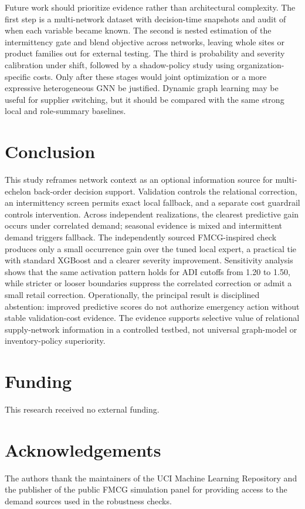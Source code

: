 \documentclass[11pt,a4paper]{article}
\begin{document}
Future work should prioritize evidence rather than architectural complexity. The first step is a multi-network dataset with decision-time snapshots and audit of when each variable became known. The second is nested estimation of the intermittency gate and blend objective across networks, leaving whole sites or product families out for external testing. The third is probability and severity calibration under shift, followed by a shadow-policy study using organization-specific costs. Only after these stages would joint optimization or a more expressive heterogeneous GNN be justified. Dynamic graph learning may be useful for supplier switching, but it should be compared with the same strong local and role-summary baselines.

\section{Conclusion}
This study reframes network context as an optional information source for multi-echelon back-order decision support. Validation controls the relational correction, an intermittency screen permits exact local fallback, and a separate cost guardrail controls intervention. Across independent realizations, the clearest predictive gain occurs under correlated demand; seasonal evidence is mixed and intermittent demand triggers fallback. The independently sourced FMCG-inspired check produces only a small occurrence gain over the tuned local expert, a practical tie with standard XGBoost and a clearer severity improvement. Sensitivity analysis shows that the same activation pattern holds for ADI cutoffs from 1.20 to 1.50, while stricter or looser boundaries suppress the correlated correction or admit a small retail correction. Operationally, the principal result is disciplined abstention: improved predictive scores do not authorize emergency action without stable validation-cost evidence. The evidence supports selective value of relational supply-network information in a controlled testbed, not universal graph-model or inventory-policy superiority.

\section*{Funding}This research received no external funding.
\section*{Acknowledgements}The authors thank the maintainers of the UCI Machine Learning Repository and the publisher of the public FMCG simulation panel for providing access to the demand sources used in the robustness checks.
\end{document}
